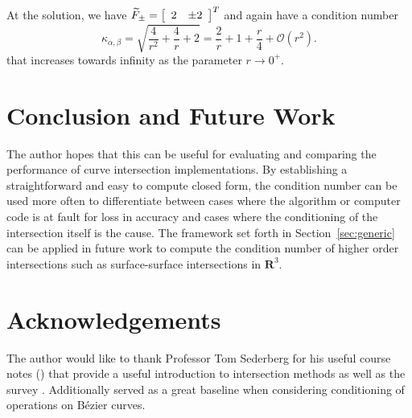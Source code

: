 \documentclass[3p, authoryear, square]{elsarticle}
\theoremstyle{definition}
\newcommand{\reals}{\mathbf{R}}
\newcommand{\bigO}[1]{\mathcal{O}\left(#1\right)}
\begin{document}
At the solution, we have \(\widetilde{F}_{\pm} = \left[ \begin{array}{c c}
2 & \pm 2 \end{array}\right]^T\)
and again have a condition number
\begin{equation}
\kappa_{\alpha, \beta} = \sqrt{\frac{4}{r^2} + \frac{4}{r} + 2} =
  \frac{2}{r} + 1 + \frac{r}{4} + \bigO{r^2}.
\end{equation}
that increases towards infinity as the parameter \(r \longrightarrow 0^+\).

\section{Conclusion and Future Work}

The author hopes that this can be useful for evaluating and comparing the
performance of curve intersection implementations. By establishing a
straightforward and easy to compute closed form, the condition number can be
used more often to differentiate between cases where the algorithm or computer
code is at fault for loss in accuracy and cases where the conditioning of the
intersection itself is the cause. The framework set forth in
Section~\ref{sec:generic} can be applied in future work to compute the
condition number of higher order intersections such as surface-surface
intersections in \(\reals^3\).

\section{Acknowledgements}

The author would like to thank Professor Tom Sederberg for his useful
course notes (\cite{SederbergNotes}) that provide a useful introduction to
intersection methods as well as the survey \cite{Sederberg1986}. Additionally
\cite{Farouki1987} served as a great baseline when considering conditioning
of operations on B\'{e}zier curves.

\section*{\refname}

\end{document}
